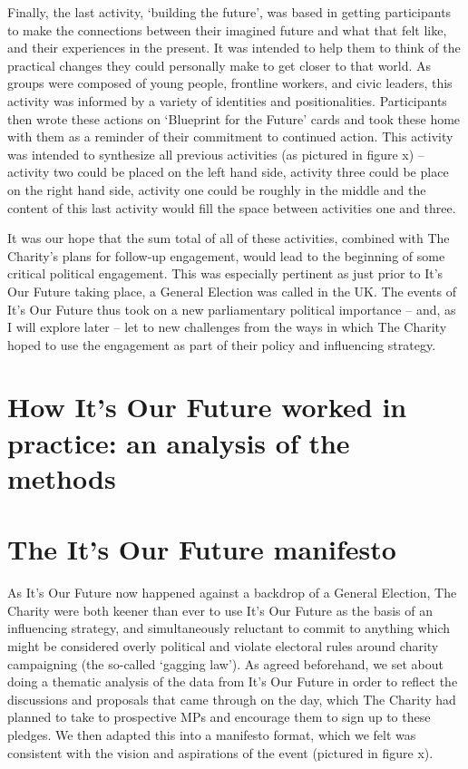 Finally, the last activity, ‘building the future’, was based in getting participants to make the connections between their imagined future and what that felt like, and their experiences in the present. It was intended to help them to think of the practical changes they could personally make to get closer to that world. As groups were composed of young people, frontline workers, and civic leaders, this activity was informed by a variety of identities and positionalities. Participants then wrote these actions on ‘Blueprint for the Future’ cards and took these home with them as a reminder of their commitment to continued action. This activity was intended to synthesize all previous activities (as pictured in figure x) – activity two could be placed on the left hand side, activity three could be place on the right hand side, activity one could be roughly in the middle and the content of this last activity would fill the space between activities one and three. 

It was our hope that the sum total of all of these activities, combined with The Charity’s plans for follow-up engagement, would lead to the beginning of some critical political engagement. This was especially pertinent as just prior to It’s Our Future taking place, a General Election was called in the UK. The events of It’s Our Future thus took on a new parliamentary political importance – and, as I will explore later – let to new challenges from the ways in which The Charity hoped to use the engagement as part of their policy and influencing strategy. 

\section{How It’s Our Future worked in practice: an analysis of the methods}

\section{The It’s Our Future manifesto}

As It’s Our Future now happened against a backdrop of a General Election, The Charity were both keener than ever to use It’s Our Future as the basis of an influencing strategy, and simultaneously reluctant to commit to anything which might be considered overly political and violate electoral rules around charity campaigning (the so-called ‘gagging law’). As agreed beforehand, we set about doing a thematic analysis of the data from It’s Our Future in order to reflect the discussions and proposals that came through on the day, which The Charity had planned to take to prospective MPs and encourage them to sign up to these pledges. We then adapted this into a manifesto format, which we felt was consistent with the vision and aspirations of the event (pictured in figure x). 

